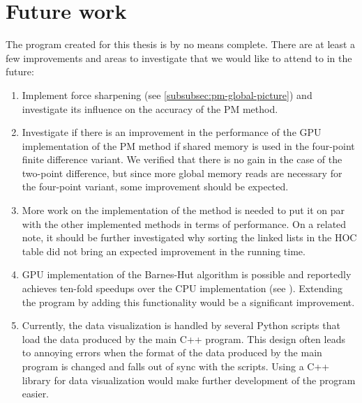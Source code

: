 \section{Future work}
The program created for this thesis is by no means complete.
There are at least a few improvements and areas to investigate that we would like to attend to in the future:
\begin{enumerate}
      \item Implement force sharpening (see \autoref{subsubsec:pm-global-picture}) and investigate its influence on the accuracy of the PM method.
      \item Investigate if there is an improvement in the performance of the GPU implementation of the PM method if shared memory is used in the four-point finite difference variant.
            We verified that there is no gain in the case of the two-point difference, but since more global memory reads are necessary for the four-point variant, some improvement should be expected.
      \item More work on the implementation of the \PThreeM{} method is needed to put it on par with the other implemented methods in terms of performance. On a related note, it should be further investigated why sorting the linked lists in the HOC table did not bring an expected improvement in the running time.
      \item GPU implementation of the Barnes-Hut algorithm is possible and reportedly achieves ten-fold speedups over the CPU implementation (see \cite{BURTSCHER201175}).
            Extending the program by adding this functionality would be a significant improvement.
      \item Currently, the data visualization is handled by several Python scripts that load the data produced by the main C++ program.
            This design often leads to annoying errors when the format of the data produced by the main program is changed and falls out of sync with the scripts.
            Using a C++ library for data visualization would make further development of the program easier.
\end{enumerate}